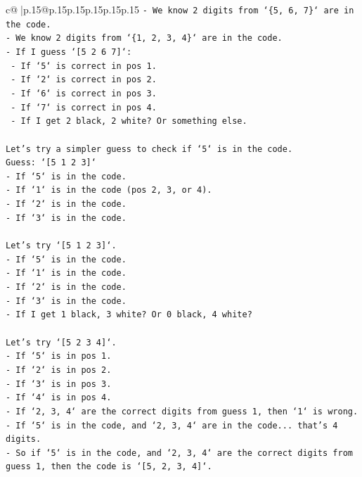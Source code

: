 \documentclass{article}
\begin{document}
{\begin{supertabular}{c@{$\;$}|p{.15\linewidth}@{}p{.15\linewidth}p{.15\linewidth}p{.15\linewidth}p{.15\linewidth}p{.15\linewidth}}
{{{\texttt{{-} We know 2 digits from `\{5, 6, 7\}` are in the code.} \\
\texttt{{-} We know 2 digits from `\{1, 2, 3, 4\}` are in the code.} \\
\texttt{{-} If I guess `{[}5 2 6 7{]}`:} \\
\texttt{    {-} If `5` is correct in pos 1.} \\
\texttt{    {-} If `2` is correct in pos 2.} \\
\texttt{    {-} If `6` is correct in pos 3.} \\
\texttt{    {-} If `7` is correct in pos 4.} \\
\texttt{    {-} If I get 2 black, 2 white? Or something else.} \\
\\ 
\texttt{Let's try a simpler guess to check if `5` is in the code.} \\
\texttt{Guess: `{[}5 1 2 3{]}`} \\
\texttt{{-} If `5` is in the code.} \\
\texttt{{-} If `1` is in the code (pos 2, 3, or 4).} \\
\texttt{{-} If `2` is in the code.} \\
\texttt{{-} If `3` is in the code.} \\
\\ 
\texttt{Let's try `{[}5 1 2 3{]}`.} \\
\texttt{{-} If `5` is in the code.} \\
\texttt{{-} If `1` is in the code.} \\
\texttt{{-} If `2` is in the code.} \\
\texttt{{-} If `3` is in the code.} \\
\texttt{{-} If I get 1 black, 3 white? Or 0 black, 4 white?} \\
\\ 
\texttt{Let's try `{[}5 2 3 4{]}`.} \\
\texttt{{-} If `5` is in pos 1.} \\
\texttt{{-} If `2` is in pos 2.} \\
\texttt{{-} If `3` is in pos 3.} \\
\texttt{{-} If `4` is in pos 4.} \\
\texttt{{-} If `2, 3, 4` are the correct digits from guess 1, then `1` is wrong.} \\
\texttt{{-} If `5` is in the code, and `2, 3, 4` are in the code... that's 4 digits.} \\
\texttt{{-} So if `5` is in the code, and `2, 3, 4` are the correct digits from guess 1, then the code is `{[}5, 2, 3, 4{]}`.} \\
}}}
\end{supertabular}}
\end{document}
